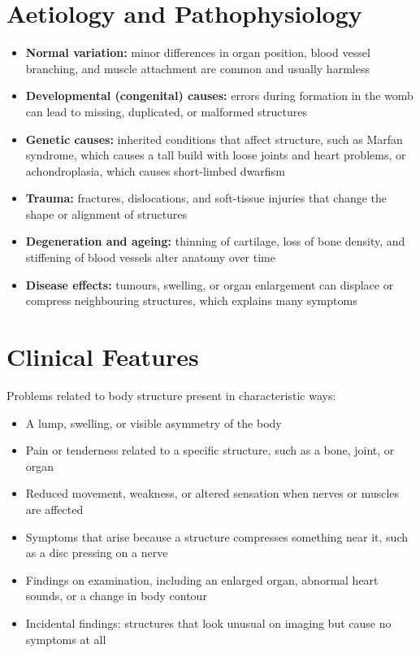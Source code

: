 \section*{Aetiology and Pathophysiology}
\begin{itemize}
    \item \textbf{Normal variation:} minor differences in organ position, blood vessel branching, and muscle attachment are common and usually harmless
    \item \textbf{Developmental (congenital) causes:} errors during formation in the womb can lead to missing, duplicated, or malformed structures
    \item \textbf{Genetic causes:} inherited conditions that affect structure, such as Marfan syndrome, which causes a tall build with loose joints and heart problems, or achondroplasia, which causes short-limbed dwarfism
    \item \textbf{Trauma:} fractures, dislocations, and soft-tissue injuries that change the shape or alignment of structures
    \item \textbf{Degeneration and ageing:} thinning of cartilage, loss of bone density, and stiffening of blood vessels alter anatomy over time
    \item \textbf{Disease effects:} tumours, swelling, or organ enlargement can displace or compress neighbouring structures, which explains many symptoms
\end{itemize}

\section*{Clinical Features}
Problems related to body structure present in characteristic ways:
\begin{itemize}
    \item A lump, swelling, or visible asymmetry of the body
    \item Pain or tenderness related to a specific structure, such as a bone, joint, or organ
    \item Reduced movement, weakness, or altered sensation when nerves or muscles are affected
    \item Symptoms that arise because a structure compresses something near it, such as a disc pressing on a nerve
    \item Findings on examination, including an enlarged organ, abnormal heart sounds, or a change in body contour
    \item Incidental findings: structures that look unusual on imaging but cause no symptoms at all
\end{itemize}

